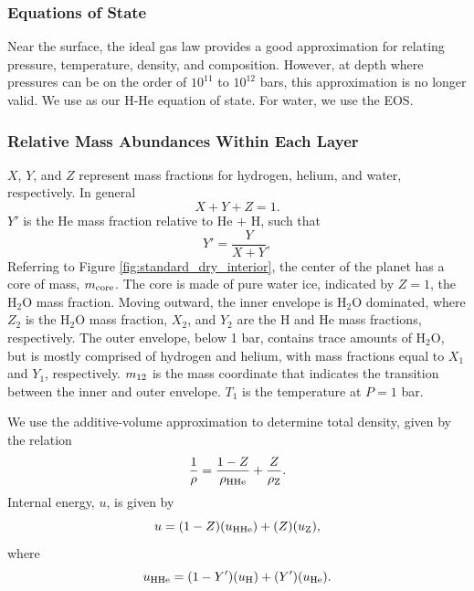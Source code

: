 \documentclass[11pt]{ucscthesisbs}
\begin{document}
\subsubsection{Equations of State}
Near the surface, the ideal gas law provides a good approximation for relating pressure, temperature, density, and composition. However, at depth where pressures can be on the order of $10^{11}$ to $10^{12}$ bars, this approximation is no longer valid. We use \citep{chabrier_eos} as our H-He equation of state. For water, we use the \citep{mazevet_2019} EOS. 

\subsubsection{Relative Mass Abundances Within Each Layer}
$X$, $Y$, and $Z$ represent mass fractions for hydrogen, helium, and water, respectively. In general
\begin{equation}
  X + Y + Z = 1 .
\end{equation}
$Y'$ is the He mass fraction relative to He $+$ H, such that
\begin{equation}
  Y' = \frac{Y}{X+Y},
\end{equation}
Referring to Figure \ref{fig:standard_dry_interior}, the center of the planet has a core of mass, $m_{\rm core}$. The core is made of pure water ice, indicated by $Z = 1$, the H$_{2}$O mass fraction. Moving outward, the inner envelope is H$_{2}$O dominated, where $Z_{2}$ is the H$_{2}$O mass fraction, $X_{2}$, and $Y_{2}$ are the H and He mass fractions, respectively. The outer envelope, below 1 bar, contains trace amounts of H$_{2}$O, but is mostly comprised of hydrogen and helium, with mass fractions equal to $X_{1}$ and $Y_{1}$, respectively. $m_{\rm 12}$ is the mass coordinate that indicates the transition between the inner and outer envelope. $T_{1}$ is the temperature at $P=1$ bar. 

We use the additive-volume approximation to determine total density, given by the relation
\begin{equation}
  \frac{1}{\rho} = \frac{1-Z}{\rho_{\rm H He}} + \frac{Z}{\rho_{\rm Z}}.
\end{equation}
Internal energy, $u$, is given by
\begin{equation}
  u = (1-Z)(u_{\rm HHe}) + (Z) (u_{\rm Z}),
\end{equation}
where
\begin{equation}
 u_{\rm HHe} = (1-Y')(u_{\rm H}) + (Y')(u_{\rm He}).
\end{equation}
\end{document}
